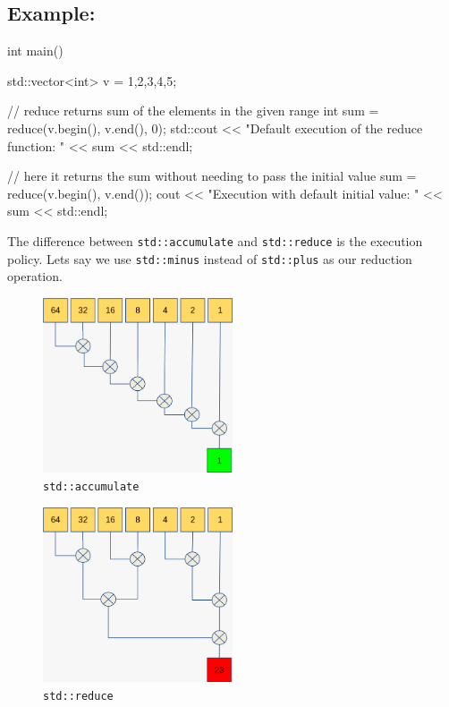 \documentclass{report}
\begin{document}
\subsection*{Example:} 
\begin{cppcode}
  
int main() {
    std::vector<int> v = {1,2,3,4,5};

    // reduce returns sum of the elements in the given range
    int sum = reduce(v.begin(), v.end(), 0); 
    std::cout << "Default execution of the reduce function: " <<  sum << std::endl;

    // here it returns the sum without needing to pass the initial value
    sum = reduce(v.begin(), v.end());
    cout << "Execution with default initial value: " << sum << std::endl;
}
\end{cppcode}
\noindent The difference between \texttt{std::accumulate} and \texttt{std::reduce} is the execution policy. Lets say we use \texttt{std::minus} instead of \texttt{std::plus} as our reduction operation.
\bigbreak \noindent
\begin{minipage}{0.5\textwidth}
    \begin{figure}[H]
\centering
\includegraphics[width=0.5\textwidth]{ ./figures/fig3.png }
\caption*{\texttt{std::accumulate} }
\end{figure}	
\end{minipage}
\begin{minipage}{0.5\textwidth}
\begin{figure}[H]
\centering
\includegraphics[width=0.5\textwidth]{ ./figures/fig4.png }
\caption*{\texttt{std::reduce} }
\end{figure}	
\end{minipage}
\end{document}
